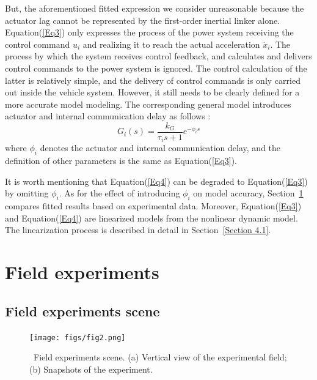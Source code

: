 \documentclass[a4paper]{cas-sc}
\begin{document}
But, the aforementioned fitted expression we consider unreasonable because the actuator lag cannot be represented by the first-order inertial linker alone. Equation(\ref{Eq3}) only expresses the process of the power system receiving the control command $u_i$ and realizing it to reach the actual acceleration ${\ddot{x}}_i$. The process by which the system receives control feedback, and calculates and delivers control commands to the power system is ignored. The control calculation of the latter is relatively simple, and the delivery of control commands is only carried out inside the vehicle system. However, it still needs to be clearly defined for a more accurate model modeling. The corresponding general model introduces actuator and internal communication delay as follows \citep{Naus2010}:
\begin{equation}
  G_i(s)=\frac{k_G}{\tau_is+1}e^{-\phi_is}
  \label{Eq4}
\end{equation}
where $\phi_i$ denotes the actuator and internal communication delay, and the definition of other parameters is the same as Equation(\ref{Eq3}).

It is worth mentioning that Equation(\ref{Eq4}) can be degraded to Equation(\ref{Eq3}) by omitting $\phi_i$. As for the effect of introducing $\phi_i$ on model accuracy, Section~\ref{Section 3} compares fitted results based on experimental data. Moreover, Equation(\ref{Eq3}) and Equation(\ref{Eq4}) are linearized models from the nonlinear dynamic model. The linearization process is described in detail in Section~\ref{Section 4.1}.



\section{Field experiments}
\label{Section 3}

\subsection{Field experiments scene}
\label{Section 3.1}

\begin{figure}
  \centering
  \texttt{[image: figs/fig2.png]}
  \caption{~Field experiments scene. (a) Vertical view of the experimental field; (b) Snapshots of the experiment.}
  \label{fig2}
\end{figure}
\end{document}
